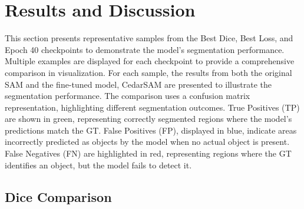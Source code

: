 \documentclass[letterpaper, 10 pt, conference]{ieeeconf}  %
\begin{document}
\begin{table}[h]
\centering
\caption{Best Dice Checkpoint: Dice and IoU Score Statistics}
\label{tab:dice_iou_stats}
\end{table}

\section{Results and Discussion}
This section presents representative samples from the Best Dice, Best Loss, and Epoch 40 checkpoints to demonstrate the model's segmentation performance. Multiple examples are displayed for each checkpoint to provide a comprehensive comparison in visualization. For each sample, the results from both the original SAM and the fine-tuned model, CedarSAM are presented to illustrate the segmentation performance. The comparison uses a confusion matrix representation, highlighting different segmentation outcomes. True Positives (TP) are shown in green, representing correctly segmented regions where the model's predictions match the GT. False Positives (FP), displayed in blue, indicate areas incorrectly predicted as objects by the model when no actual object is present. False Negatives (FN) are highlighted in red, representing regions where the GT identifies an object, but the model fails to detect it.

\subsection{Dice Comparison}
\end{document}
